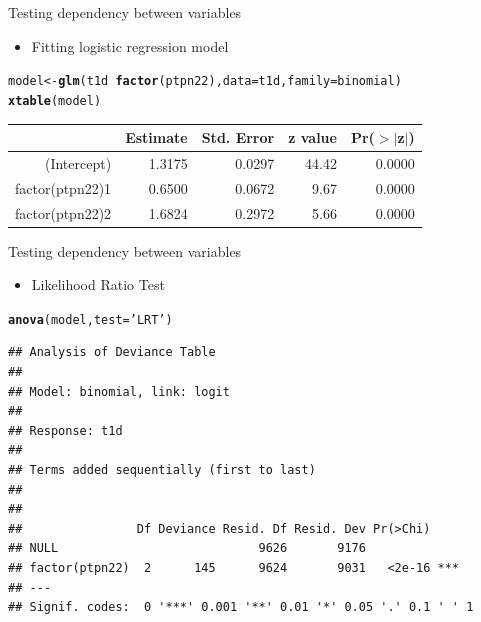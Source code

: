 \documentclass{beamer}\usepackage[]{graphicx}\usepackage[]{color}
\makeatletter
\newcommand{\hlstr}[1]{\textcolor[rgb]{0.192,0.494,0.8}{#1}}%
\newcommand{\hlopt}[1]{\textcolor[rgb]{0,0,0}{#1}}%
\newcommand{\hlstd}[1]{\textcolor[rgb]{0.345,0.345,0.345}{#1}}%
\newcommand{\hlkwb}[1]{\textcolor[rgb]{0.69,0.353,0.396}{#1}}%
\newcommand{\hlkwc}[1]{\textcolor[rgb]{0.333,0.667,0.333}{#1}}%
\newcommand{\hlkwd}[1]{\textcolor[rgb]{0.737,0.353,0.396}{\textbf{#1}}}%
\newenvironment{kframe}{%
 \def\at@end@of@kframe{}%
 \ifinner\ifhmode%
  \def\at@end@of@kframe{\end{minipage}}%
  \begin{minipage}{\columnwidth}%
 \fi\fi%
 \def\FrameCommand##1{\hskip\@totalleftmargin \hskip-\fboxsep
 \colorbox{shadecolor}{##1}\hskip-\fboxsep
     \hskip-\linewidth \hskip-\@totalleftmargin \hskip\columnwidth}%
 \MakeFramed {\advance\hsize-\width
   \@totalleftmargin\z@ \linewidth\hsize
   \@setminipage}}%
 {\par\unskip\endMakeFramed%
 \at@end@of@kframe}
\newenvironment{knitrout}{}{} %
\makeatother
\begin{document}
\begin{frame}[fragile]{Testing dependency between variables}
  \begin{itemize}
    \item Fitting logistic regression model
  \end{itemize}
\begin{kframe}
\begin{alltt}
\hlstd{model} \hlkwb{<-} \hlkwd{glm}\hlstd{(t1d} \hlopt{~} \hlkwd{factor}\hlstd{(ptpn22),} \hlkwc{data}\hlstd{=t1d,} \hlkwc{family}\hlstd{=binomial)}
\hlkwd{xtable}\hlstd{(model)}
\end{alltt}
\end{kframe}%
\begin{table}[ht]
\centering
\begin{tabular}{rrrrr}
  \hline
 & Estimate & Std. Error & z value & Pr($>$$|$z$|$) \\ 
  \hline
(Intercept) & 1.3175 & 0.0297 & 44.42 & 0.0000 \\ 
  factor(ptpn22)1 & 0.6500 & 0.0672 & 9.67 & 0.0000 \\ 
  factor(ptpn22)2 & 1.6824 & 0.2972 & 5.66 & 0.0000 \\ 
   \hline
\end{tabular}
\end{table}

\end{frame}

\begin{frame}[fragile]{Testing dependency between variables}
  \begin{itemize}
    \item Likelihood Ratio Test
  \end{itemize}
\begin{knitrout}\tiny
{}\color{fgcolor}\begin{kframe}
\begin{alltt}
\hlkwd{anova}\hlstd{(model,} \hlkwc{test}\hlstd{=}\hlstr{'LRT'}\hlstd{)}
\end{alltt}
\begin{verbatim}
## Analysis of Deviance Table
## 
## Model: binomial, link: logit
## 
## Response: t1d
## 
## Terms added sequentially (first to last)
## 
## 
##                Df Deviance Resid. Df Resid. Dev Pr(>Chi)    
## NULL                            9626       9176             
## factor(ptpn22)  2      145      9624       9031   <2e-16 ***
## ---
## Signif. codes:  0 '***' 0.001 '**' 0.01 '*' 0.05 '.' 0.1 ' ' 1
\end{verbatim}
\end{kframe}
\end{knitrout}
\end{frame}
\end{document}
